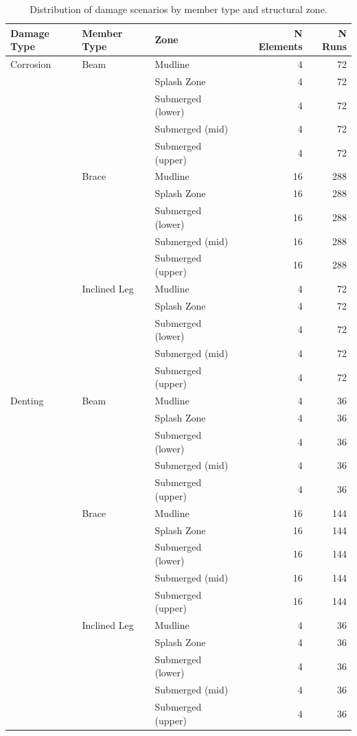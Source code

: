 \begin{table}[htbp]
  \centering
  \caption{Distribution of damage scenarios by member type and structural zone.}
  \label{tab:desglose_casos}
  \begin{tabular}{llllrr}
    \toprule
    Damage Type & Member Type & Zone & & N Elements & N Runs \\
    \midrule
    Corrosion & Beam & Mudline & & 4 & 72 \\
     &  & Splash Zone & & 4 & 72 \\
     &  & Submerged (lower) & & 4 & 72 \\
     &  & Submerged (mid) & & 4 & 72 \\
     &  & Submerged (upper) & & 4 & 72 \\
     & Brace & Mudline & & 16 & 288 \\
     &  & Splash Zone & & 16 & 288 \\
     &  & Submerged (lower) & & 16 & 288 \\
     &  & Submerged (mid) & & 16 & 288 \\
     &  & Submerged (upper) & & 16 & 288 \\
     & Inclined Leg & Mudline & & 4 & 72 \\
     &  & Splash Zone & & 4 & 72 \\
     &  & Submerged (lower) & & 4 & 72 \\
     &  & Submerged (mid) & & 4 & 72 \\
     &  & Submerged (upper) & & 4 & 72 \\
    \midrule
    Denting & Beam & Mudline & & 4 & 36 \\
     &  & Splash Zone & & 4 & 36 \\
     &  & Submerged (lower) & & 4 & 36 \\
     &  & Submerged (mid) & & 4 & 36 \\
     &  & Submerged (upper) & & 4 & 36 \\
     & Brace & Mudline & & 16 & 144 \\
     &  & Splash Zone & & 16 & 144 \\
     &  & Submerged (lower) & & 16 & 144 \\
     &  & Submerged (mid) & & 16 & 144 \\
     &  & Submerged (upper) & & 16 & 144 \\
     & Inclined Leg & Mudline & & 4 & 36 \\
     &  & Splash Zone & & 4 & 36 \\
     &  & Submerged (lower) & & 4 & 36 \\
     &  & Submerged (mid) & & 4 & 36 \\
     &  & Submerged (upper) & & 4 & 36 \\
    \bottomrule
  \end{tabular}
\end{table}